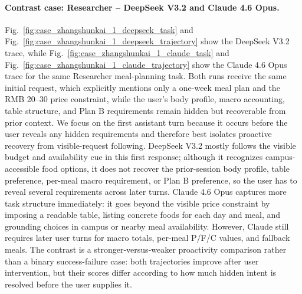 \paragraph{Contrast case: Researcher -- DeepSeek V3.2 and Claude 4.6 Opus.}
Fig.~\ref{fig:case_zhangshunkai_1_deepseek_task} and Fig.~\ref{fig:case_zhangshunkai_1_deepseek_trajectory} show the DeepSeek V3.2 trace, while Fig.~\ref{fig:case_zhangshunkai_1_claude_task} and Fig.~\ref{fig:case_zhangshunkai_1_claude_trajectory} show the Claude 4.6 Opus trace for the same Researcher meal-planning task.
Both runs receive the same initial request, which explicitly mentions only a one-week meal plan and the RMB 20--30 price constraint, while the user's body profile, macro accounting, table structure, and Plan B requirements remain hidden but recoverable from prior context.
We focus on the first assistant turn because it occurs before the user reveals any hidden requirements and therefore best isolates proactive recovery from visible-request following.
DeepSeek V3.2 mostly follows the visible budget and availability cue in this first response; although it recognizes campus-accessible food options, it does not recover the prior-session body profile, table preference, per-meal macro requirement, or Plan B preference, so the user has to reveal several requirements across later turns.
Claude 4.6 Opus captures more task structure immediately: it goes beyond the visible price constraint by imposing a readable table, listing concrete foods for each day and meal, and grounding choices in campus or nearby meal availability.
However, Claude still requires later user turns for macro totals, per-meal P/F/C values, and fallback meals.
The contrast is a stronger-versus-weaker proactivity comparison rather than a binary success-failure case: both trajectories improve after user intervention, but their scores differ according to how much hidden intent is resolved before the user supplies it.



